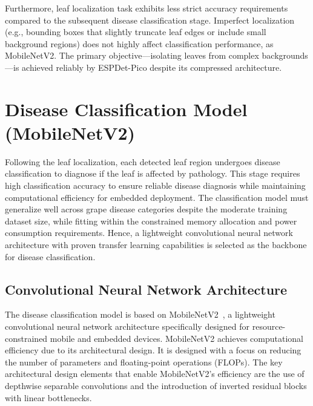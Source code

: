 Furthermore, leaf localization task exhibits less strict accuracy requirements compared to the subsequent disease classification stage. Imperfect localization (e.g., bounding boxes that slightly truncate leaf edges or include small background regions) does not highly affect classification performance, as MobileNetV2. The primary objective—isolating leaves from complex backgrounds—is achieved reliably by ESPDet-Pico despite its compressed architecture.




\section{Disease Classification Model (MobileNetV2)}
\label{sec:mobilenetv2}

Following the leaf localization, each detected leaf region undergoes disease classification to diagnose if the leaf is affected by pathology. This stage requires high classification accuracy to ensure reliable disease diagnosis while maintaining computational efficiency for embedded deployment. The classification model must generalize well across grape disease categories despite the moderate training dataset size, while fitting within the constrained memory allocation and power consumption requirements. Hence, a lightweight convolutional neural network architecture with proven transfer learning capabilities is selected as the backbone for disease classification. 



\subsection{Convolutional Neural Network Architecture}

The disease classification model is based on MobileNetV2~\cite{sandler2018mobilenetv2}, a lightweight convolutional neural network architecture specifically designed for resource-constrained mobile and embedded devices. MobileNetV2 achieves computational efficiency due to its architectural design. It is designed with a focus on reducing the number of parameters and floating-point operations (FLOPs). The key architectural design elements that enable MobileNetV2's efficiency are the use of depthwise separable convolutions and the introduction of inverted residual blocks with linear bottlenecks.

